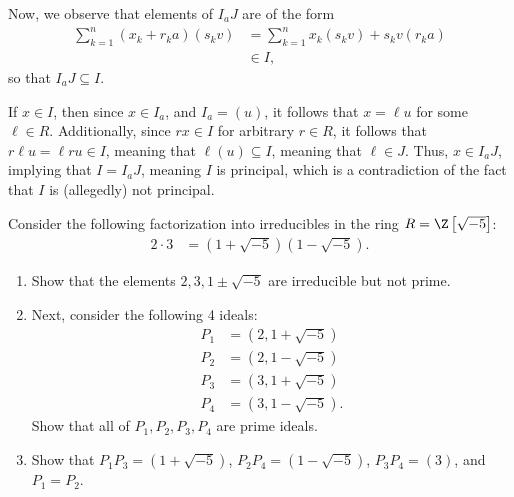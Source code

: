 \documentclass[10pt]{mypackage}
\begin{document}
\begin{solution}
  Now, we observe that elements of $I_aJ$ are of the form
  \begin{align*}
    \sum_{k=1}^{n} \left( x_k + r_ka \right)\left( s_k v \right) &= \sum_{k=1}^{n} x_k\left( s_k v \right) + s_kv\left( r_ka \right)\\
                                                                 &\in I,
  \end{align*}
  so that $I_aJ\subseteq I$.\newline

  If $x\in I$, then since $x\in I_a$, and $I_a = \left( u \right)$, it follows that $x = \ell u$ for some $\ell \in R$. Additionally, since $rx\in I$ for arbitrary $r\in R$, it follows that $ r\ell u = \ell ru \in I $, meaning that $ \ell \left( u \right) \subseteq I$, meaning that $\ell \in J$. Thus, $x\in I_aJ$, implying that $I = I_aJ$, meaning $I$ is principal, which is a contradiction of the fact that $I$ is (allegedly) not principal.
\end{solution}
\begin{problem}[Problem 5]
  Consider the following factorization into irreducibles in the ring $R = \Z\left[ \sqrt{-5} \right]$:
  \begin{align*}
    2\cdot 3 &= \left( 1 + \sqrt{-5} \right)\left( 1 - \sqrt{-5} \right).
  \end{align*}
  \begin{enumerate}[9a]
    \item Show that the elements $2,3,1\pm \sqrt{-5}$ are irreducible but not prime.
    \item Next, consider the following 4 ideals:
      \begin{align*}
        P_1 &= \left( 2,1+\sqrt{-5} \right)\\
        P_2 &= \left( 2,1-\sqrt{-5} \right)\\
        P_3 &= \left( 3,1+\sqrt{-5} \right)\\
        P_4 &= \left( 3,1-\sqrt{-5} \right).
      \end{align*}
      Show that all of $P_1,P_2,P_3,P_4$ are prime ideals.
    \item Show that $P_1P_3 = \left( 1 + \sqrt{-5} \right)$, $P_2P_4 = \left( 1-\sqrt{-5} \right)$, $P_3P_4 = \left( 3 \right)$, and $P_1 = P_2$.
  \end{enumerate}
\end{problem}
\end{document}
